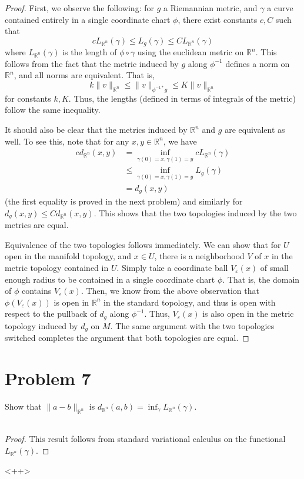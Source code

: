 \documentclass[fontsize=11pt]{scrartcl} %
\numberwithin{equation}{section} %
\numberwithin{figure}{section} %
\numberwithin{table}{section} %
\newcommand{\R}{\mathbb{R}}
\begin{document}
\begin{proof}
    First, we observe the following: for $g$ a Riemannian metric, and $\gamma$ a
    curve contained entirely in a single coordinate chart $\phi$, there exist
    constants $c,C$ such that
    \[
        cL_{\R^n}(\gamma) \leq L_g(\gamma) \leq CL_{\R^n}(\gamma)
    \]
    where $L_{\R^n}(\gamma)$ is the length of $\phi\circ\gamma$ using the
    euclidean metric on $\R^n$.  This follows from the fact that the
    metric induced by $g$ along $\phi^{-1}$ defines a norm on $\R^n$, and all
    norms are equivalent. That is,
    \[
        k\|v\|_{\R^n} \leq \|v\|_{\phi^{-1*}g}\leq K\|v\|_{\R^n}
    \]
    for constants $k,K$. Thus, the lengths (defined in terms of integrals of the
    metric) follow the same inequality. 

    It should also be clear that the metrics induced by $\R^n$ and $g$ are
    equivalent as well. To see this, note that for any $x,y\in \R^n$, we have
    \[
        \begin{aligned}
        cd_{\R^n}(x,y) &= \inf_{\gamma(0)=x,\gamma(1)=y}cL_{\R^n}(\gamma)\\
        &\leq \inf_{\gamma(0)=x,\gamma(1)=y}L_g(\gamma)\\
        &=d_g(x,y)
    \end{aligned}
    \]
    (the first equality is proved in the next problem)
    and similarly for $d_g(x,y)\leq Cd_{\R^n}(x,y)$. This shows that the two
    topologies induced by the two metrics are equal.

    Equivalence of the two topologies follows immediately. We can show that for
    $U$ open in the manifold topology, and $x\in U$, there is a neighborhood $V$
    of $x$ in the metric topology contained in $U$. Simply take a coordinate
    ball $V_{\varepsilon}(x)$ of small enough radius to be contained in a single
    coordinate chart $\phi$. That is, the domain of $\phi$ contains
    $V_{\varepsilon}(x)$. Then, we know from the above observation that
    $\phi(V_{\varepsilon}(x))$ is open in $\R^n$ in the standard topology, and
    thus is open with respect to the pullback of $d_g$ along $\phi^{-1}$. Thus,
    $V_{\varepsilon}(x)$ is also open in the metric topology induced by $d_g$ on
    $M$. The same argument with the two topologies switched completes the
    argument that both topologies are equal.
\end{proof}

\section*{Problem 7}
Show that $\|a-b\|_{\R^n}$ is $d_{\R^n}(a,b) = \inf_{\gamma}L_{\R^n}(\gamma)$.
\\
\\
\begin{proof}
    This result follows from standard variational calculus on the functional
    $L_{\R^n}(\gamma)$. 
\end{proof}<++>
\end{document}
